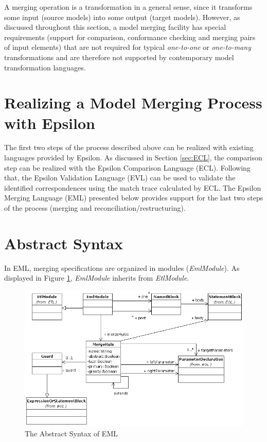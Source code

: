 A merging operation is a transformation in a general sense, since it transforms some input (source models) into some output (target models). However, as discussed throughout this section, a model merging facility has special requirements (support for comparison, conformance checking and merging pairs of input elements) that are not required for typical \textit{one-to-one} or \textit{one-to-many} transformations \cite{Czarnecki2003} and are therefore not supported by contemporary model transformation languages.

\section{Realizing a Model Merging Process with Epsilon}

The first two steps of the process described above can be realized with existing languages provided by Epsilon. As discussed in Section \ref{sec:ECL}, the comparison step can be realized with the Epsilon Comparison Language (ECL). Following that, the Epsilon Validation Language (EVL) can be used to validate the identified correspondences using the match trace calculated by ECL. The Epsilon Merging Language (EML) presented below provides support for the last two steps of the process (merging and reconciliation/restructuring).

\section{Abstract Syntax}

In EML, merging specifications are organized in modules (\emph{EmlModule}). As displayed in Figure \ref{fig:EmlAbstractSyntax}, \emph{EmlModule} inherits from \emph{EtlModule}.

\begin{figure}
  \centering
  \includegraphics{images/EmlAbstractSyntax.png}
  \caption{The Abstract Syntax of EML}
  \label{fig:EmlAbstractSyntax}
\end{figure}

